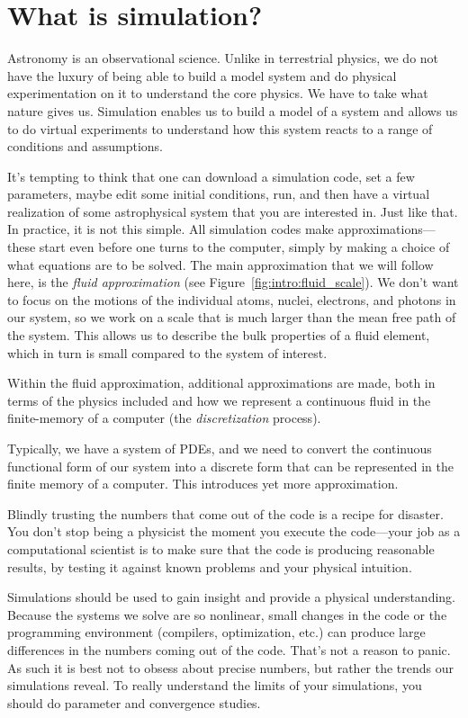 \section{What is simulation?}

Astronomy is an observational science.  Unlike in terrestrial physics,
we do not have the luxury of being able to build a model system and do
physical experimentation on it to understand the core physics.  We
have to take what nature gives us.  Simulation enables us to build a
model of a system and allows us to do virtual experiments to
understand how this system reacts to a range of conditions and
assumptions.

It's tempting to think that one can download a simulation code, set a
few parameters, maybe edit some initial conditions, run, and then have
a virtual realization of some astrophysical system that you are
interested in.  Just like that.  In practice, it is not this simple.
All simulation codes make approximations---these start even before one
turns to the computer, simply by making a choice of what equations are
to be solved.  The main approximation that we will follow here, is the
{\em fluid approximation} (see Figure~\ref{fig:intro:fluid_scale}).
We don't want to focus on the motions of the individual atoms, nuclei,
electrons, and photons in our system, so we work on a scale that is
much larger than the mean free path of the system.  This allows us to
describe the bulk properties of a fluid element, which in turn is
small compared to the system of interest.

Within the fluid approximation, additional approximations are made,
both in terms of the physics included and how we represent a continuous
fluid in the finite-memory of a computer (the {\em discretization} process).

Typically, we have a system of PDEs, and we need to
convert the continuous functional form of our system into a discrete
form that can be represented in the finite memory of a computer.  This
introduces yet more approximation.


Blindly trusting the numbers that come out of the code is a recipe
for disaster.  You don't stop being a physicist the moment you execute
the code---your job as a computational scientist is to make sure that
the code is producing reasonable results, by testing it against known
problems and your physical intuition.

Simulations should be used to gain insight and provide a physical
understanding.  Because the systems we solve are so nonlinear, small
changes in the code or the programming environment (compilers,
optimization, etc.)  can produce large differences in the numbers
coming out of the code.  That's not a reason to panic.  As such it is
best not to obsess about precise numbers, but rather the trends our
simulations reveal.  To really understand the limits of your
simulations, you should do parameter and convergence studies.

